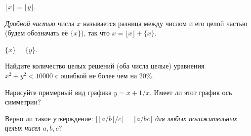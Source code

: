 \documentclass[a4paper,11pt]{article}
\begin{document}
$\lfloor x\rfloor =\lfloor y\rfloor$.

\emph{Дробной частью} числа $x$ называется разница между числом и его целой частью (будем обозначать её $\{x\}$), так что $x=\lfloor x\rfloor +\{x\}$.

$\{x\}=\{y\}$.

Найдите количество целых решений (оба числа целые) уравнения $x^2+y^2<10000$ с ошибкой не более чем на $20\%$.

Нарисуйте примерный вид графика $y=x+1/x$. Имеет ли этот график ось симметрии?

Верно ли такое утверждение: \emph{$\lfloor\lfloor a/b\rfloor/c\rfloor=\lfloor a/bc\rfloor$ для любых положительных целых чисел $a,b,c$}?


\end{document}
